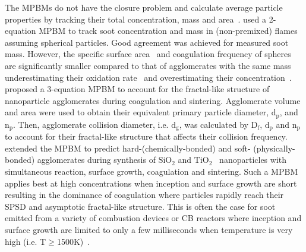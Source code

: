 The MPBMs do not have the closure problem and calculate average particle properties by tracking their total concentration, mass \citep{kruis1993simple} and area~\citep{tsantilis2004soft, lindstedt1994simplified}. \citet{leung1991simplified} used a 2-equation MPBM to track soot concentration and mass in (non-premixed) flames assuming spherical particles. Good agreement was achieved for measured soot mass. However, the specific surface area~\citep{lindstedt1994simplified} and coagulation frequency of spheres are significantly smaller compared to that of agglomerates with the same mass underestimating their oxidation rate~\citep{kelesidis2019estimating} and overestimating their concentration~\citep{kruis1993simple}. \citet{kruis1993simple} proposed a 3-equation MPBM to account for the fractal-like structure of nanoparticle agglomerates during coagulation and sintering. Agglomerate volume and area were used to obtain their equivalent primary particle diameter, $\mathrm{d_p}$, and $\mathrm{n_p}$. Then, agglomerate collision diameter, i.e. $\mathrm{d_g}$, was calculated by $\mathrm{D_f}$, $\mathrm{d_p}$ and $\mathrm{n_p}$ to account for their fractal-like structure that affects their collision frequency. \citet{tsantilis2004soft} extended the MPBM to predict hard-(chemically-bonded) and soft- (physically-bonded) agglomerates during synthesis of $\mathrm{SiO_2}$ and $\mathrm{TiO_2}$~\citep{grass2006design} nanoparticles with simultaneous reaction, surface growth, coagulation and sintering. Such a MPBM applies best at high concentrations when inception and surface growth are short~\citep{Spicer2002} resulting in the dominance of coagulation where particles rapidly reach their SPSD and asymptotic fractal-like structure. This is often the case for soot emitted from a variety of combustion devices or CB reactors where inception and surface growth are limited to only a few milliseconds when temperature is very high (i.e. T$\ge$1500K)~\citep{kholghy2018reactive}.

